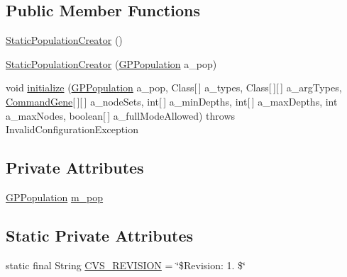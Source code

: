 \subsection*{Public Member Functions}
\begin{DoxyCompactItemize}
\item 
\hyperlink{classorg_1_1jgap_1_1gp_1_1impl_1_1_static_population_creator_a34d848b9a233c436809d2be7aaedfde3}{Static\-Population\-Creator} ()
\item 
\hyperlink{classorg_1_1jgap_1_1gp_1_1impl_1_1_static_population_creator_abaf7f9f794b6c931d3120983ac41eef0}{Static\-Population\-Creator} (\hyperlink{classorg_1_1jgap_1_1gp_1_1impl_1_1_g_p_population}{G\-P\-Population} a\-\_\-pop)
\item 
void \hyperlink{classorg_1_1jgap_1_1gp_1_1impl_1_1_static_population_creator_a3421cfdab2bfb0cbcbb14972b9f006a1}{initialize} (\hyperlink{classorg_1_1jgap_1_1gp_1_1impl_1_1_g_p_population}{G\-P\-Population} a\-\_\-pop, Class\mbox{[}$\,$\mbox{]} a\-\_\-types, Class\mbox{[}$\,$\mbox{]}\mbox{[}$\,$\mbox{]} a\-\_\-arg\-Types, \hyperlink{classorg_1_1jgap_1_1gp_1_1_command_gene}{Command\-Gene}\mbox{[}$\,$\mbox{]}\mbox{[}$\,$\mbox{]} a\-\_\-node\-Sets, int\mbox{[}$\,$\mbox{]} a\-\_\-min\-Depths, int\mbox{[}$\,$\mbox{]} a\-\_\-max\-Depths, int a\-\_\-max\-Nodes, boolean\mbox{[}$\,$\mbox{]} a\-\_\-full\-Mode\-Allowed)  throws Invalid\-Configuration\-Exception 
\end{DoxyCompactItemize}
\subsection*{Private Attributes}
\begin{DoxyCompactItemize}
\item 
\hyperlink{classorg_1_1jgap_1_1gp_1_1impl_1_1_g_p_population}{G\-P\-Population} \hyperlink{classorg_1_1jgap_1_1gp_1_1impl_1_1_static_population_creator_a974a3a9f0228282dfce6842fc416ce25}{m\-\_\-pop}
\end{DoxyCompactItemize}
\subsection*{Static Private Attributes}
\begin{DoxyCompactItemize}
\item 
static final String \hyperlink{classorg_1_1jgap_1_1gp_1_1impl_1_1_static_population_creator_ad04d9cc2baafe4dffdbc82065a75b8be}{C\-V\-S\-\_\-\-R\-E\-V\-I\-S\-I\-O\-N} = \char`\"{}\$Revision\-: 1. \$\char`\"{}
\end{DoxyCompactItemize}
